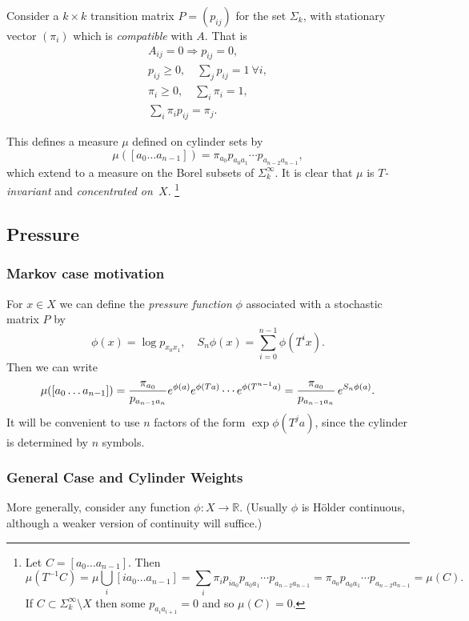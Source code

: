 \documentclass[a4paper]{amsart}
\theoremstyle{plain}
\theoremstyle{definition}
\theoremstyle{remark}
\begin{document}
Consider a $ k \times k $ transition matrix $ P = (p_{ij} ) $ for the set $ \Sigma_k $, with stationary vector $( \pi_i)$ which is \emph{compatible} with $ A $.  That is
\begin{gather*}
A_{ij} = 0 \Longrightarrow p_{ij} = 0 ,\\
p_{ij} \geq 0 , \quad \sum_j p_{ij} = 1\  \forall i,\\
\pi_i \geq  0, \quad \sum_i \pi_i = 1,  \\
\sum_i \pi_i p_{ij} = \pi_j .
\end{gather*}

\medskip This defines a measure $ \mu $ defined on cylinder sets by
\[
\mu([a_0\dots a_{n-1}]) = \pi_{a_0} p_{a_0a_1}\cdots p_{a_{n-2}a_{n-1}},
\]
which extend to a measure on the Borel subsets of $ \Sigma_k^\infty$.  It is clear that $ \mu $ is \emph{$ T $-invariant}
and \emph{concentrated on~$ X $}.%
\footnote{
Let $ C = [a_0\dots a_{n-1}] $. Then
\[
\mu(T^{-1}C )   = \mu \bigcup_i [ia_0\dots a_{n-1}] = \sum_i \pi_i p_{ia_0} p_{a_0a_1}\cdots p_{a_{n-2}a_{n-1}}  
    = \pi_{a_0} p_{a_0a_1}\cdots p_{a_{n-2}a_{n-1}} = \mu(C).
\]
If $ C \subset \Sigma_k^\infty \setminus X $ then some $ p_{a_i a_{i+1}} = 0 $ and so $ \mu(C) = 0 $.
}

\subsection{Pressure} \label{ssecpr}

\subsubsection{Markov case motivation} For $ x\in X $ we can define the \emph{pressure function} $ \phi $ associated with a stochastic matrix $ P $ by 
\[
\phi(x) = \log p_{x_0 x_1}, \quad  S_n \phi  (x) = \sum_{i=0}^{n-1} \phi (T^i x).
\]
Then we can write 
\[
\mu( [a_0\dots a_{n-1}] ) = \frac{ \pi_{a_0} }{ p_{a_{n-1}a_n} } e^{\phi(a)}e^{\phi(Ta) }\cdots e^{\phi(T^{n-1}a)} \\
              =  \frac{ \pi_{a_0} }{ p_{a_{n-1}a_n} }\, e^{S_n\phi(a)}. 
\]
It will be  convenient to use $ n $ factors of the form $ \exp \phi(T^ja)  $, since the cylinder is determined by $ n $ symbols.

\subsubsection{General Case and Cylinder Weights} More generally, consider any function $ \phi :X \to \mathbb{R} $.  (Usually $ \phi $ is H\"{o}lder continuous, although a weaker version of continuity will suffice.)
\end{document}
